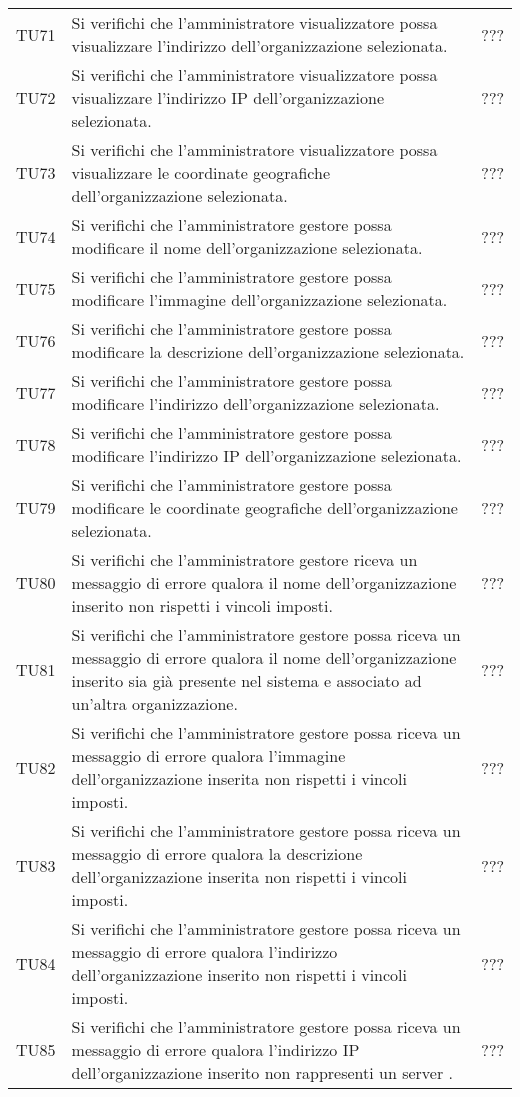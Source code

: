 {\begin{longtable}{ c C{13cm} C{1cm}}
TU71 & Si verifichi che l'amministratore visualizzatore possa visualizzare l’indirizzo dell'organizzazione selezionata. & ??? \\
TU72 & Si verifichi che l'amministratore visualizzatore possa visualizzare l’indirizzo IP dell'organizzazione selezionata. & ??? \\
TU73 & Si verifichi che l'amministratore visualizzatore possa visualizzare le coordinate geografiche dell'organizzazione selezionata. & ??? \\
TU74 & Si verifichi che l'amministratore gestore possa modificare il nome dell'organizzazione selezionata. & ??? \\
TU75 & Si verifichi che l'amministratore gestore possa modificare l’immagine dell'organizzazione selezionata. & ??? \\
TU76 & Si verifichi che l'amministratore gestore possa modificare la descrizione dell'organizzazione selezionata. & ??? \\
TU77 & Si verifichi che l'amministratore gestore possa modificare l’indirizzo dell'organizzazione selezionata. & ??? \\
TU78 & Si verifichi che l'amministratore gestore possa modificare l’indirizzo IP dell'organizzazione selezionata. & ??? \\
TU79 & Si verifichi che l'amministratore gestore possa modificare le coordinate geografiche dell'organizzazione selezionata. & ??? \\
TU80 & Si verifichi che l'amministratore gestore riceva un messaggio di errore qualora il nome dell'organizzazione inserito non rispetti i vincoli imposti. & ??? \\
TU81 & Si verifichi che l'amministratore gestore possa riceva un messaggio di errore qualora il nome dell'organizzazione inserito sia già presente nel sistema e associato ad un'altra organizzazione. & ??? \\
TU82 & Si verifichi che l'amministratore gestore possa riceva un messaggio di errore qualora l'immagine dell'organizzazione inserita non rispetti i vincoli imposti. & ??? \\
TU83 & Si verifichi che l'amministratore gestore possa riceva un messaggio di errore qualora la descrizione dell'organizzazione inserita non rispetti i vincoli imposti. & ??? \\
TU84 & Si verifichi che l'amministratore gestore possa riceva un messaggio di errore qualora l'indirizzo dell'organizzazione inserito non rispetti i vincoli imposti. & ??? \\
TU85 & Si verifichi che l'amministratore gestore possa riceva un messaggio di errore qualora l'indirizzo IP dell'organizzazione inserito non rappresenti un server . & ??? \\

\end{longtable}}
